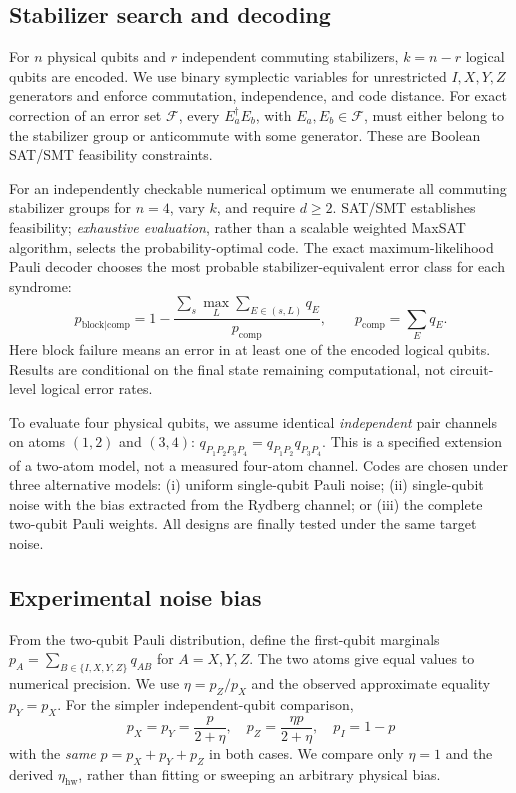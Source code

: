 \subsection{Stabilizer search and decoding}
For $n$ physical qubits and $r$ independent commuting stabilizers,
$k=n-r$ logical qubits are encoded. We use binary symplectic variables
for unrestricted $I,X,Y,Z$ generators and enforce commutation,
independence, and code distance. For exact correction of an error set
$\mathcal F$, every $E_a^\dagger E_b$, with $E_a,E_b\in\mathcal F$, must
either belong to the stabilizer group or anticommute with some generator.
These are Boolean SAT/SMT feasibility constraints.

For an independently checkable numerical optimum we enumerate all
commuting stabilizer groups for $n=4$, vary $k$, and require $d\geq2$.
SAT/SMT establishes feasibility; \emph{exhaustive evaluation}, rather than
a scalable weighted MaxSAT algorithm, selects the probability-optimal code.
The exact maximum-likelihood Pauli decoder chooses the most probable
stabilizer-equivalent error class for each syndrome:
\begin{equation}
p_{\mathrm{block}|\mathrm{comp}}
=1-\frac{\displaystyle\sum_s\max_L\sum_{E\in(s,L)}q_E}
{\displaystyle p_{\mathrm{comp}}},
\qquad p_{\mathrm{comp}}=\sum_Eq_E.
\label{eq:res_ml}
\end{equation}
Here block failure means an error in at least one of the encoded logical
qubits. Results are conditional on the final state remaining computational,
not circuit-level logical error rates.

To evaluate four physical qubits, we assume identical \emph{independent}
pair channels on atoms $(1,2)$ and $(3,4)$:
$q_{P_1P_2P_3P_4}=q_{P_1P_2}q_{P_3P_4}$.
This is a specified extension of a two-atom model, not a measured four-atom
channel. Codes are chosen under three alternative models: (i) uniform
single-qubit Pauli noise; (ii) single-qubit noise with the bias extracted
from the Rydberg channel; or (iii) the complete two-qubit Pauli weights.
All designs are finally tested under the same target noise.

\subsection{Experimental noise bias}
From the two-qubit Pauli distribution, define the first-qubit marginals
$p_A=\sum_{B\in\{I,X,Y,Z\}}q_{AB}$ for $A=X,Y,Z$.
The two atoms give equal values to numerical precision. We use
$\eta=p_Z/p_X$ and the observed approximate equality $p_Y=p_X$.
For the simpler independent-qubit comparison,
\begin{equation}
p_X=p_Y=\frac{p}{2+\eta},\quad
p_Z=\frac{\eta p}{2+\eta},\quad p_I=1-p
\label{eq:res_bias}
\end{equation}
with the \emph{same} $p=p_X+p_Y+p_Z$ in both cases.
We compare only $\eta=1$ and the derived $\eta_{\mathrm{hw}}$, rather
than fitting or sweeping an arbitrary physical bias.

